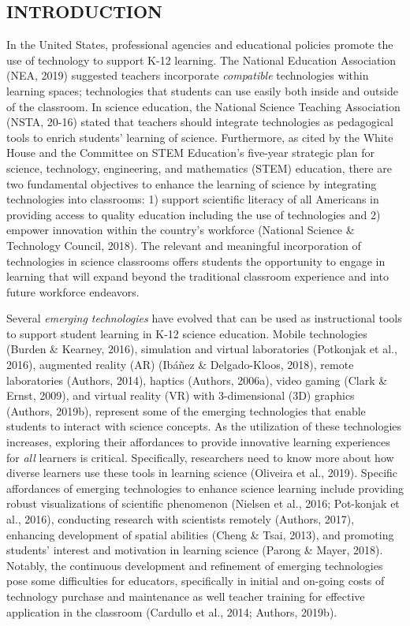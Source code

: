 \documentclass[11.5pt]{sig-alternate} %
\begin{document}
\begin{large}
\section*{INTRODUCTION}

In the United States, professional agencies and educational policies promote the use of technology to support K-12 learning. The National Education Association (NEA, 2019) suggested teachers incorporate \textit{compatible} technologies within learning spaces; technologies that students can use easily both inside and outside of the classroom. In science education, the National Science Teaching Association (NSTA, 20-16) stated that teachers should integrate technologies as pedagogical tools to enrich students’ learning of science. Furthermore, as cited by the White House and the Committee on STEM Education’s five-year strategic plan for science, technology, engineering, and mathematics (STEM) education, there are two fundamental objectives to enhance the learning of science by integrating technologies into classrooms: 1) support scientific literacy of all Americans in providing access to quality education including the use of technologies and 2) empower innovation within the country’s workforce (National Science \& Technology Council, 2018). The relevant and meaningful incorporation of technologies in science classrooms offers students the opportunity to engage in learning that will expand beyond the traditional classroom experience and into future workforce endeavors. 

Several \textit{emerging technologies} have evolved that can be used as instructional tools to support student learning in K-12 science education. Mobile technologies (Burden \& Kearney, 2016), simulation and virtual laboratories (Potkonjak et al., 2016), augmented reality (AR) (Ibáñez \& Delgado-Kloos, 2018), remote laboratories (Authors, 2014), haptics (Authors, 2006a), video gaming (Clark \& Ernst, 2009), and virtual reality (VR) with 3-dimensional (3D) graphics (Authors, 2019b), represent some of the emerging technologies that enable students to interact with science concepts. As the utilization of these technologies increases, exploring their affordances to provide innovative learning experiences for \textit{all} learners is critical. Specifically, researchers need to know more about how diverse learners use these tools in learning science (Oliveira et al., 2019). Specific affordances of emerging technologies to enhance science learning include providing robust visualizations of scientific phenomenon (Nielsen et al., 2016; Pot-konjak et al., 2016), conducting research with scientists remotely (Authors, 2017), enhancing development of spatial abilities (Cheng \& Tsai, 2013), and promoting students’ interest and motivation in learning science (Parong \& Mayer, 2018). Notably, the continuous development and refinement of emerging technologies pose some difficulties for educators, specifically in initial and on-going costs of technology purchase and maintenance as well teacher training for effective application in the classroom (Cardullo et al., 2014; Authors, 2019b). 


\end{large}
\end{document}
